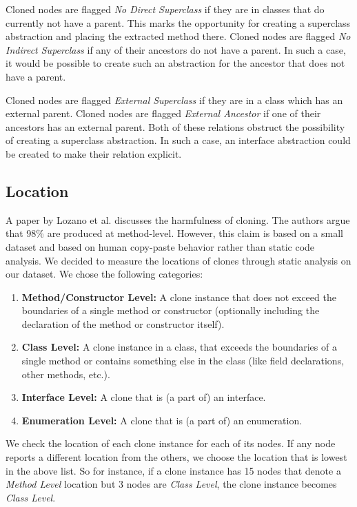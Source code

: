 Cloned nodes are flagged \textit{No Direct Superclass} if they are in classes that do currently not have a parent. This marks the opportunity for creating a superclass abstraction and placing the extracted method there. Cloned nodes are flagged \textit{No Indirect Superclass} if any of their ancestors do not have a parent. In such a case, it would be possible to create such an abstraction for the ancestor that does not have a parent.

Cloned nodes are flagged \textit{External Superclass} if they are in a class which has an external parent. Cloned nodes are flagged \textit{External Ancestor} if one of their ancestors has an external parent. Both of these relations obstruct the possibility of creating a superclass abstraction. In such a case, an interface abstraction could be created to make their relation explicit.

\subsection{Location}\label{sec:setuplocation}
A paper by Lozano et al. \cite{lozano2007evaluating} discusses the harmfulness of cloning. The authors argue that 98\% are produced at method-level. However, this claim is based on a small dataset and based on human copy-paste behavior rather than static code analysis. We decided to measure the locations of clones through static analysis on our dataset. We chose the following categories:
\begin{enumerate}
  \item \textbf{Method/Constructor Level:} A clone instance that does not exceed the boundaries of a single method or constructor (optionally including the declaration of the method or constructor itself).
  \item \textbf{Class Level:} A clone instance in a class, that exceeds the boundaries of a single method or contains something else in the class (like field declarations, other methods, etc.).
  \item \textbf{Interface Level:} A clone that is (a part of) an interface.
  \item \textbf{Enumeration Level:} A clone that is (a part of) an enumeration.
\end{enumerate}
We check the location of each clone instance for each of its nodes. If any node reports a different location from the others, we choose the location that is lowest in the above list. So for instance, if a clone instance has 15 nodes that denote a \textit{Method Level} location but 3 nodes are \textit{Class Level}, the clone instance becomes \textit{Class Level}.

